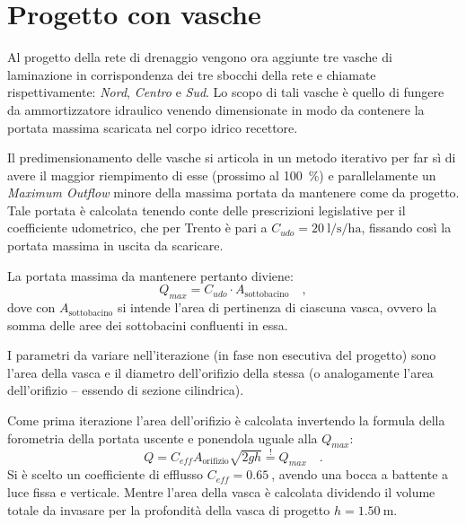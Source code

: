 \clearpage
\section{Progetto con vasche}
Al progetto della rete di drenaggio vengono ora aggiunte tre vasche di laminazione in corrispondenza dei tre sbocchi della rete e chiamate rispettivamente: \emph{Nord}, \emph{Centro} e \emph{Sud}.
Lo scopo di tali vasche è quello di fungere da ammortizzatore idraulico venendo dimensionate in modo da contenere la portata massima scaricata nel corpo idrico recettore.

Il predimensionamento delle vasche si articola in un metodo iterativo per far sì di avere il maggior riempimento di esse (prossimo al \SI{100}{\percent}) e parallelamente un \emph{Maximum Outflow} minore della massima portata da mantenere come da progetto. 
Tale portata è calcolata tenendo conte delle prescrizioni legislative per il coefficiente udometrico, che per Trento è pari a $C_{udo} = \SI{20}{\litre\per\second\per\hectare}$, fissando così la portata massima in uscita da scaricare. 

La portata massima da mantenere pertanto diviene:
\begin{equation}
    Q_{max} = C_{udo} \cdot A_{\text{sottobacino}}
    \label{eq:qmax} \quad ,
\end{equation}
dove con $A_{\text{sottobacino}}$ si intende l'area di pertinenza di ciascuna vasca, ovvero la somma delle aree dei sottobacini confluenti in essa.

I parametri da variare nell'iterazione (in fase non esecutiva del progetto) sono l'area della vasca e il diametro dell'orifizio della stessa (o analogamente l'area dell'orifizio -- essendo di sezione cilindrica). 


Come prima iterazione l'area dell'orifizio è calcolata invertendo la formula della forometria della portata uscente e ponendola uguale alla $Q_{max}$:
\begin{equation}
    Q  = C_{eff} A_{\text{orifizio}} \sqrt{2 g h} \overset{!}{=} Q_{max} \quad .
\end{equation}
Si è scelto un coefficiente di efflusso $C_{eff} = \SI{0.65}{}$, avendo una bocca a battente a luce fissa e verticale. 
Mentre l'area della vasca è calcolata dividendo il volume totale da invasare per la profondità della vasca di progetto $h = \SI{1.50}{\metre}$.

